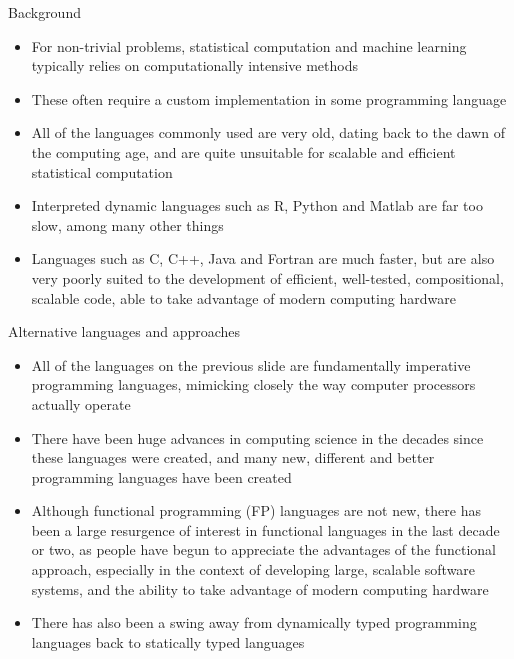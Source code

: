 \documentclass[mathserif,handout]{beamer}
\begin{document}
\begin{frame}{Background}
\protect\hypertarget{background}{}

\begin{itemize}

\item
  For non-trivial problems, statistical computation and machine learning typically relies on
  computationally intensive methods%
\item
  These often require a custom implementation in some programming
  language
\item
  All of the languages commonly used are very old, dating back to the
  dawn of the computing age, and are quite unsuitable for scalable and
  efficient statistical computation
\item
  Interpreted dynamic languages such as R, Python and Matlab are far too
  slow, among many other things
\item
  Languages such as C, C++, Java and Fortran are much faster, but are
  also very poorly suited to the development of efficient, well-tested, compositional,
  scalable code, able to take advantage of modern computing hardware
\end{itemize}

\end{frame}

\begin{frame}{Alternative languages and approaches}
\protect\hypertarget{alternative-languages-and-approaches}{}

\begin{itemize}

\item
  All of the languages on the previous slide are fundamentally
  \alert{imperative} programming languages, mimicking closely the way
  computer processors actually operate
\item
  There have been huge advances in computing science in the decades
  since these languages were created, and many new, different and better
  programming languages have been created
\item
  Although \alert{functional} programming (FP) languages are not new,
  there has been a large resurgence of interest in functional languages
  in the last decade or two, as people have begun to appreciate the
  advantages of the functional approach, especially in the context of
  developing large, scalable software systems, and the ability to take
  advantage of modern computing hardware
\item
  There has also been a swing away from \alert{dynamically typed}
  programming languages back to \alert{statically typed} languages
\end{itemize}

\end{frame}
\end{document}
